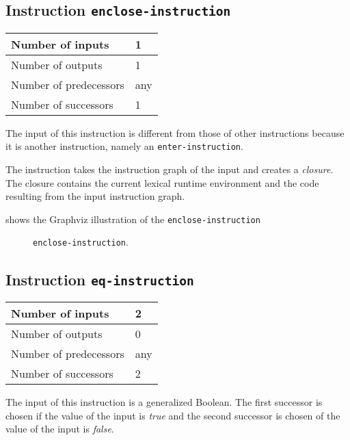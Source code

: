 \subsection{Instruction \texttt{enclose-instruction}}
\label{mir-instruction-enclose}

\begin{tabular}{|l|l|}
\hline
Number of inputs & 1\\
\hline
Number of outputs & 1\\
\hline
Number of predecessors & any\\
\hline
Number of successors & 1\\
\hline
\end{tabular}

The input of this instruction is different from those of other
instructions because it is another instruction, namely an
\texttt{enter-instruction}.

The instruction takes the instruction graph of the input and creates a
\emph{closure}.  The closure contains the current lexical runtime
environment and the code resulting from the input instruction graph.

 shows the Graphviz illustration of the
\texttt{enclose-instruction}

\begin{figure}
\begin{center}
\end{center}
\caption{\label{fig-enclose-instruction}
\texttt{enclose-instruction}.}
\end{figure}

\subsection{Instruction \texttt{eq-instruction}}
\label{mir-instruction-eq}

\begin{tabular}{|l|l|}
\hline
Number of inputs & 2\\
\hline
Number of outputs & 0\\
\hline
Number of predecessors & any\\
\hline
Number of successors & 2\\
\hline
\end{tabular}

The input of this instruction is a generalized Boolean.  The first
successor is chosen if the value of the input is \emph{true} and the
second successor is chosen of the value of the input is \emph{false}.

